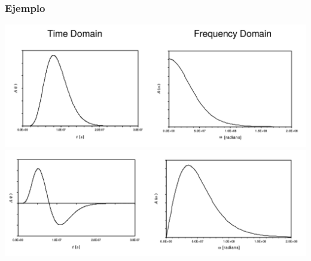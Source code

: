\documentclass{beamer}
\begin{document}
\begin{frame}
\frametitle{Ejemplo}
\begin{block}{}
\includegraphics[height=0.35\textheight,width=\textwidth]{d1/espectro_pulso_unipolar} \\
\includegraphics[height=0.35\textheight,width=\textwidth]{d1/espectro_pulso_bipolar} 
\end{block}
\end{frame} 
\end{document}
